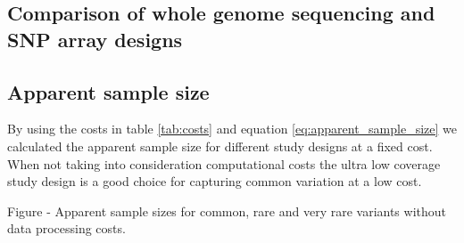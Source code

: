 



\subsection{Comparison of whole genome sequencing and SNP array designs}






\subsection{Apparent sample size}
By using the costs in table \ref{tab:costs} and equation \ref{eq:apparent_sample_size} we calculated the apparent sample size for different study designs at a fixed cost. When not taking into consideration computational costs the ultra low coverage study design is a good choice for capturing common variation at a low cost.

Figure - Apparent sample sizes for common, rare and very rare variants without data processing costs. 


